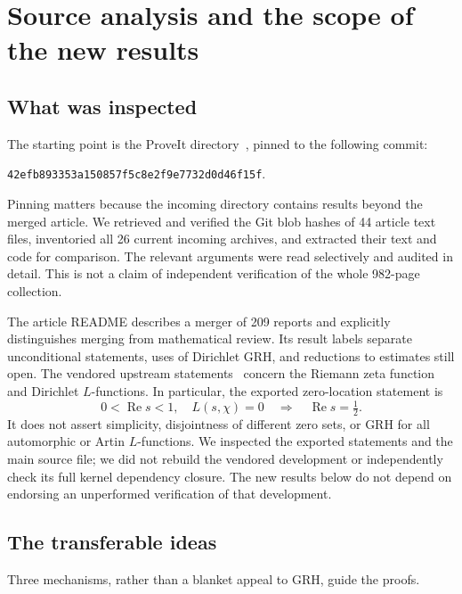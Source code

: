 \section{Source analysis and the scope of the new results}
\label{sec:overview}

\subsection{What was inspected}
The starting point is the ProveIt directory~\cite{ProveIt}, pinned to
the following commit:
\begin{center}
\texttt{42efb893353a150857f5c8e2f9e7732d0d46f15f}.
\end{center}
Pinning matters because the incoming directory contains results beyond
the merged article. We retrieved and verified the Git blob hashes of
44 article text files, inventoried all 26 current incoming archives,
and extracted their text and code for comparison. The relevant arguments
were read selectively and audited in detail. This is not a claim of
independent verification of the whole 982-page collection.

The article README describes a merger of 209 reports and explicitly
distinguishes merging from mathematical review. Its result labels separate
unconditional statements, uses of Dirichlet GRH, and reductions to
estimates still open. The vendored upstream statements~\cite{GRHLean}
concern the Riemann zeta function and Dirichlet $L$-functions. In particular,
the exported zero-location statement is
\[
 0<\operatorname{Re}s<1,\quad L(s,\chi)=0
 \quad\Longrightarrow\quad \operatorname{Re}s=\tfrac12.
\]
It does not assert simplicity, disjointness of different zero sets,
or GRH for all automorphic or Artin $L$-functions.
We inspected the exported statements and the main source file; we did
not rebuild the vendored development or independently check its full
kernel dependency closure. The new results below do not depend on
endorsing an unperformed verification of that development.

\subsection{The transferable ideas}
Three mechanisms, rather than a blanket appeal to GRH, guide the proofs.

